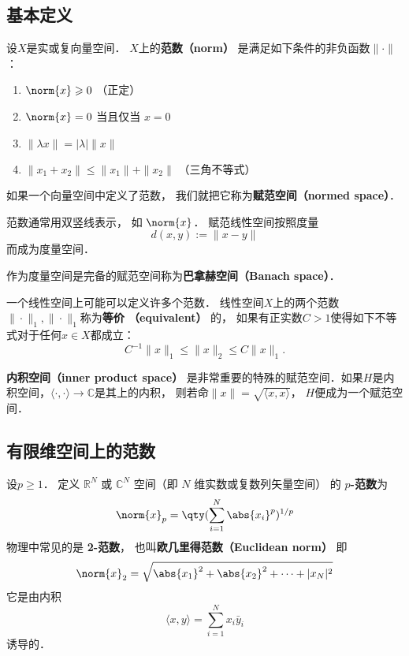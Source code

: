 

\subsection{基本定义}

设$X$是实或复向量空间． $X$上的\textbf{范数（norm）} 是满足如下条件的非负函数$\|\cdot\|$：
\begin{enumerate}
\item $\norm{x} \geqslant 0$ （正定）
\item $\norm{x} = 0$ 当且仅当 $x = 0$
\item $\|\lambda x\| = |\lambda|\|x\|$
\item $\|x_1+x_2\| \leqslant \|x_1\|+ \|x_2\|$ （三角不等式）
\end{enumerate}
如果一个向量空间中定义了范数， 我们就把它称为\textbf{赋范空间（normed space）}．

范数通常用双竖线表示， 如 $\norm{x}$． 赋范线性空间按照度量
$$
d(x,y):=\|x-y\|
$$
而成为度量空间． 

作为度量空间是完备的赋范空间称为\textbf{巴拿赫空间（Banach space）}．%

一个线性空间上可能可以定义许多个范数． 线性空间$X$上的两个范数$\|\cdot\|_1,\|\cdot\|_1$称为\textbf{等价 （equivalent）} 的， 如果有正实数$C>1$使得如下不等式对于任何$x\in X$都成立：
$$
C^{-1}\|x\|_{1}\leq\|x\|_2\leq C\|x\|_1.
$$

\textbf{内积空间（inner product space）} 是非常重要的特殊的赋范空间．如果$H$是内积空间，$\langle\cdot,\cdot\rangle\to\mathbb C$是其上的内积， 则若命$\|x\|=\sqrt{\langle x,x\rangle }$， $H$便成为一个赋范空间．

\subsection{有限维空间上的范数}
设$p\geq1$． 定义 $\mathbb R^N$ 或 $\mathbb C^N$ 空间（即 $N$ 维实数或复数列矢量空间） 的 \textbf{$p$-范数}为
\begin{equation}
\norm{ x}_p = \qty(\sum_{i=1}^N \abs{x_i}^p)^{1/p}
\end{equation}
物理中常见的是 \textbf{2-范数}， 也叫\textbf{欧几里得范数（Euclidean norm）} 即
\begin{equation}
\norm{ x}_2 = \sqrt{\abs{x_1}^2 + \abs{x_2}^2 + \dots+|x_N|^2}
\end{equation}
它是由内积
$$
\langle x,y\rangle=\sum_{i=1}^Nx_i\bar y_i
$$
诱导的．

